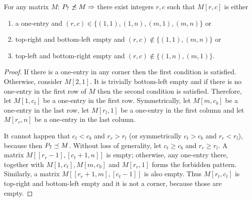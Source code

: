 \begin{lemma}
\label{lemma:p33}
For any matrix $M$: $P_7\not\preceq M\Rightarrow$ there exist integers $r,c$ such that $M[r,c]$ is either
\begin{enumerate}
\item a one-entry and $(r,c)\in\{(1,1),(1,n),(m,1),(m,n)\}$ or
\item top-right and bottom-left empty and $(r,c)\not\in\{(1,1),(m,n)\}$ or
\item top-left and bottom-right empty and $(r,c)\not\in\{(1,n),(m,1)\}$.
\end{enumerate}
\end{lemma}
\begin{proof}
If there is a one-entry in any corner then the first condition is satisfied. Otherwise, consider $M[2,1]$. It is trivially bottom-left empty and if there is no one-entry in the first row of $M$ then the second condition is satisfied. Therefore, let $M[1,c_t]$ be a one-entry in the first row. Symmetrically, let $M[m,c_b]$ be a one-entry in the last row, let $M[r_l,1]$ be a one-entry in the first column and let $M[r_r,n]$ be a one-entry in the last column.

It cannot happen that $c_t<c_b$ and $r_r>r_l$ (or symmetrically $c_t>c_b$ and $r_r<r_l$), because then $P_7\preceq M$. Without loss of generality, let $c_t\geq c_b$ and $r_r\geq r_l$. A matrix $M[[r_r-1],[c_t+1,n]]$ is empty; otherwise, any one-entry there, together with $M[1,c_t],M[m,c_b]$ and $M[r_r,1]$ forms the forbidden pattern. Similarly, a matrix $M[[r_r+1,m],[c_t-1]]$ is also empty. Thus $M[r_t,c_t]$ is top-right and bottom-left empty and it is not a corner, because those are empty.
\end{proof}

